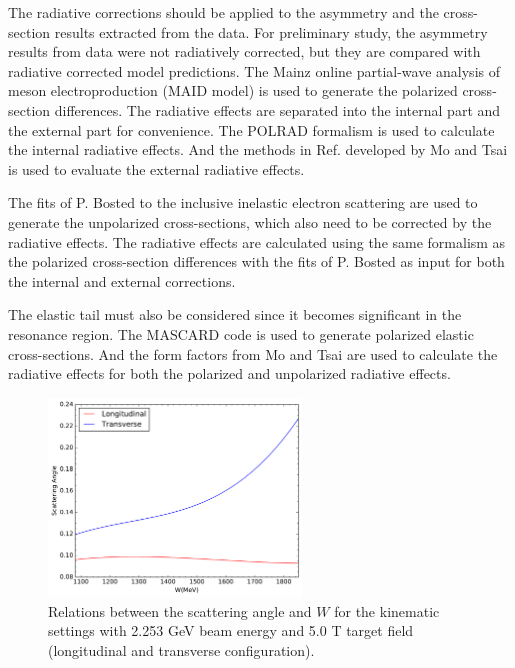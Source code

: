 The radiative corrections should be applied to the asymmetry and the cross-section results extracted from the data. For preliminary study, the asymmetry results from data were not radiatively corrected, but they are compared with radiative corrected model predictions. The Mainz online partial-wave analysis of meson electroproduction (MAID model) \cite{Drechsel2007} is used to generate the polarized cross-section differences. The radiative effects are separated into the internal part and the external part for convenience. The POLRAD formalism \cite{Akushevich1997} is used to calculate the internal radiative effects. And the methods in Ref. \cite{Mo1969} developed by Mo and Tsai is used to evaluate the external radiative effects.

The fits of P. Bosted to the inclusive inelastic electron scattering \cite{Bosted2008} are used to generate the unpolarized cross-sections, which also need to be corrected by the radiative effects. The radiative effects are calculated using the same formalism as the polarized cross-section differences with the fits of P. Bosted as input for both the internal and external corrections.

The elastic tail must also be considered since it becomes significant in the resonance region. The MASCARD code \cite{Afanasev2001} is used to generate polarized elastic cross-sections. And the form factors from Mo and Tsai are used to calculate the radiative effects for both the polarized and unpolarized radiative effects.

\begin{figure}[tb!]
  \centering
  \includegraphics[width=0.6\textwidth]{figs/scattering-angle.pdf}
  \caption[Relations between the scattering angle and $W$.]{Relations between the scattering angle and $W$ for the kinematic settings with 2.253 GeV beam energy and 5.0 T target field (longitudinal and transverse configuration). \label{C8S2F2}}
\end{figure}

